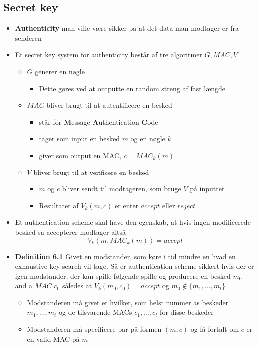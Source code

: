 \documentclass[a4, english]{article}
\begin{document}
\subsection{Secret key}
\begin{itemize}
	\item \textbf{Authenticity} man ville være sikker på at det data man modtager er fra senderen 
	\item Et secret key system for authenticity består af tre algoritmer $G, MAC, V$ 
  \begin{itemize}
  	\item $G$ generer en nøgle
    \begin{itemize}
    	\item Dette gøres ved at outputte en random streng af fast længde 
    \end{itemize}
    \item $MAC$ bliver brugt til at autentificere en besked
    \begin{itemize}
    	\item står for \textbf{M}essage \textbf{A}uthentication \textbf{C}ode
      \item tager som input en besked $m$ og en nøgle $k$
      \item giver som output en MAC, $c= MAC_k(m)$ 
    \end{itemize}
    \item $V$ bliver brugt til at verificere en besked
    \begin{itemize}
    	\item $m$ og $c$ bliver sendt til modtageren, som bruge $V$ på inputtet
      \item Resultatet af $V_k(m,c)$ er enter $accept$ eller $reject$
    \end{itemize}
  \end{itemize}
  \item Et authentication scheme skal have den egenskab, at hvis ingen modificerede besked så accepterer modtager altså
\begin{equation*}
V_k(m,MAC_k(m)) = accept
\end{equation*}
  \item \textbf{Definition 6.1} Givet en modstander, som køre i tid mindre en hvad en exhaustive key search vil tage. Så er authentication scheme sikkert hvis der er igen modstander, der kan spille følgende spille og producere en besked $m_0$ and a $MAC$ $c_0$ således at $V_k(m_0,c_0) = accept$ og $m_0 \notin \{m_1, \dots,m_t\}$
  \begin{itemize}
  	\item Modstanderen må givet et hvilket, som helst nummer as beskeder $m_1, \dots, m_t$ og de tilsvarende MACs $c_1, \dots, c_t$ for disse beskeder
    \item Modstanderen må specificere par på formen $(m,c)$ og få fortalt om $c$ er en valid MAC på $m$ 
  \end{itemize}
\end{itemize}
\end{document}
